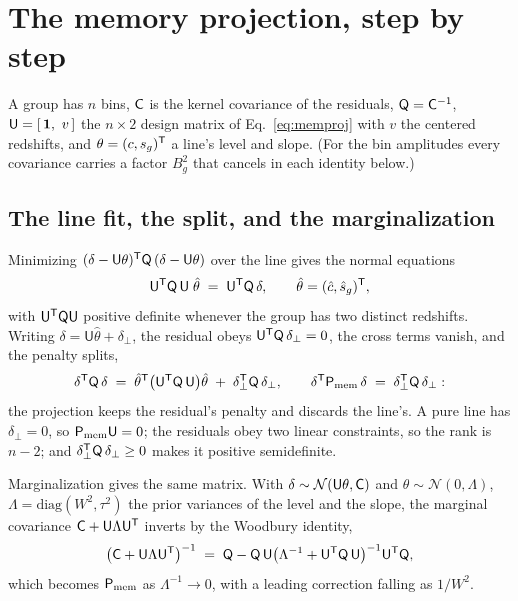 \section{The memory projection, step by step}
\label{app:memory}

A group has $n$ bins, $\mathsf{C}$ is the kernel covariance of the
residuals, $\mathsf{Q} = \mathsf{C}^{-1}$, $\mathsf{U} = [\,\ones,\ v\,]$ the
$n \times 2$ design matrix of Eq.~\eqref{eq:memproj} with $v$ the
centered redshifts, and $\theta = (c, s_g)^{\mathsf{T}}$ a line's level and slope.
(For the bin amplitudes every covariance carries a factor $B_g^2$ that
cancels in each identity below.)

\subsection{The line fit, the split, and the marginalization}

Minimizing $(\delta - \mathsf{U}\theta)^{\mathsf{T}} \mathsf{Q}\,
(\delta - \mathsf{U}\theta)$ over the line gives the normal equations
\begin{equation}
  \mathsf{U}^{\mathsf{T}} \mathsf{Q}\,\mathsf{U}\;\hat{\theta}
  \;=\;
  \mathsf{U}^{\mathsf{T}} \mathsf{Q}\,\delta ,
  \qquad
  \hat{\theta} = (\hat{c}, \hat{s}_g)^{\mathsf{T}} ,
  \label{eq:memnormal}
\end{equation}
with $\mathsf{U}^{\mathsf{T}}\mathsf{Q}\mathsf{U}$ positive definite whenever the
group has two distinct redshifts.  Writing
$\delta = \mathsf{U}\hat{\theta} + \delta_\perp$, the residual obeys
$\mathsf{U}^{\mathsf{T}} \mathsf{Q}\, \delta_\perp = 0$, the cross terms vanish,
and the penalty splits,
\begin{equation}
  \delta^{\mathsf{T}} \mathsf{Q}\,\delta
  \;=\;
  \hat{\theta}^{\mathsf{T}}
  \bigl(\mathsf{U}^{\mathsf{T}} \mathsf{Q}\,\mathsf{U}\bigr)\hat{\theta}
  \;+\;
  \delta_\perp^{\mathsf{T}} \mathsf{Q}\, \delta_\perp ,
  \qquad
  \delta^{\mathsf{T}} \mathsf{P}_{\rm mem}\,\delta
  \;=\;
  \delta_\perp^{\mathsf{T}} \mathsf{Q}\, \delta_\perp :
  \label{eq:memsplit}
\end{equation}
the projection keeps the residual's penalty and discards the line's.
A pure line has $\delta_\perp = 0$, so $\mathsf{P}_{\rm mem}\mathsf{U} = 0$;
the residuals obey two linear constraints, so the rank is $n - 2$; and
$\delta_\perp^{\mathsf{T}} \mathsf{Q}\, \delta_\perp \geq 0$ makes it positive
semidefinite.

Marginalization gives the same matrix.  With
$\delta \sim \mathcal{N}(\mathsf{U}\theta, \mathsf{C})$ and
$\theta \sim \mathcal{N}(0, \Lambda)$, $\Lambda = \mathrm{diag}(W^2,
\tau^2)$ the prior variances of the level and the slope, the marginal
covariance $\mathsf{C} + \mathsf{U}\Lambda\mathsf{U}^{\mathsf{T}}$ inverts by the
Woodbury identity,
\begin{equation}
  \bigl(\mathsf{C} + \mathsf{U}\Lambda\mathsf{U}^{\mathsf{T}}\bigr)^{-1}
  \;=\;
  \mathsf{Q} - \mathsf{Q}\,\mathsf{U}
  \bigl(\Lambda^{-1} + \mathsf{U}^{\mathsf{T}} \mathsf{Q}\,\mathsf{U}\bigr)^{-1}
  \mathsf{U}^{\mathsf{T}} \mathsf{Q} ,
  \label{eq:woodbury}
\end{equation}
which becomes $\mathsf{P}_{\rm mem}$ as $\Lambda^{-1} \to 0$, with a leading
correction falling as $1/W^2$.

